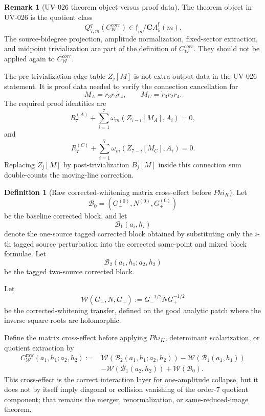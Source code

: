 \documentclass[11pt,a4paper]{amsart}
\def\Phi{Phi}%
\def\corr{corr}%
\theoremstyle{plain}
\theoremstyle{definition}
\newtheorem{definition}[theorem]{Definition}
\newtheorem{remark}[theorem]{Remark}
\newcommand{\corr}{\mathrm{corr}}
\begin{document}
\begin{remark}[UV-026 theorem object versus proof data]
\label{rem:uv026-object-versus-proof-data}
The theorem object in UV-026 is the quotient class
\[
Q_{7,m}^q(C_{\mathcal W}^{\corr})
\in
\mathfrak f_m/\mathbf C A_5^{\mathfrak f}(m).
\]
The source-bidegree projection, amplitude normalization, fixed-sector
extraction, and midpoint trivialization are part of the definition of
\(C_{\mathcal W}^{\corr}\).  They should not be applied again to
\(C_{\mathcal W}^{\corr}\).

The pre-trivialization edge table \(Z_j[M]\) is not extra output data in the
UV-026 statement.  It is proof data needed to verify the connection
cancellation for
\[
M_A=\dot r_3r_2\dot r_4,
\qquad
M_C=\dot r_3\dot r_2r_4.
\]
The required proof identities are
\[
R_7^{(A)}
+
\sum_{i=1}^{7}\omega_m(Z_{7-i}[M_A],A_i)=0,
\]
and
\[
R_7^{(C)}
+
\sum_{i=1}^{7}\omega_m(Z_{7-i}[M_C],A_i)=0.
\]
Replacing \(Z_j[M]\) by post-trivialization \(B_j[M]\) inside this connection
sum double-counts the moving-line correction.
\end{remark}

\begin{definition}[Raw corrected-whitening matrix cross-effect before \(\Phi_K\)]
\label{def:raw-corrected-whitening-cross-effect}
Let
\[
\mathcal B_0=(G_-^{(0)},N^{(0)},G_+^{(0)})
\]
be the baseline corrected block, and let
\[
\mathcal B_1(a_i,h_i)
\]
denote the one-source tagged corrected block obtained by substituting only the
\(i\)-th tagged source perturbation into the corrected same-point and mixed
block formulae.  Let
\[
\mathcal B_2(a_1,h_1;a_2,h_2)
\]
be the tagged two-source corrected block.

Let
\[
\mathcal W(G_-,N,G_+):=G_-^{-1/2}NG_+^{-1/2}
\]
be the corrected-whitening transfer, defined on the good analytic patch where
the inverse square roots are holomorphic.

Define the matrix cross-effect before applying \(\Phi_K\), determinant
scalarization, or quotient extraction by
\[
\begin{aligned}
C_{\mathcal W}^{\mathrm{raw}}(a_1,h_1;a_2,h_2)
:={}&
\mathcal W(\mathcal B_2(a_1,h_1;a_2,h_2))
-\mathcal W(\mathcal B_1(a_1,h_1))
\\
&-\mathcal W(\mathcal B_1(a_2,h_2))
+\mathcal W(\mathcal B_0).
\end{aligned}
\]
This cross-effect is the correct interaction layer for one-amplitude
collapse, but it does not by itself imply diagonal or collision vanishing
of the order-\(7\) quotient component; that remains the merger,
renormalization, or same-reduced-image theorem.
\end{definition}
\end{document}
